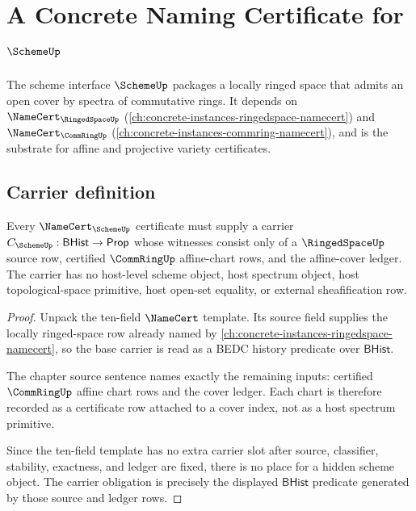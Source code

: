 \chapter{A Concrete Naming Certificate for $\SchemeUp$}
\label{ch:concrete-instances-scheme-namecert}

The scheme interface $\SchemeUp$ packages a locally ringed space that admits an open cover by spectra of commutative rings. It depends on $\NameCert_{\RingedSpaceUp}$ (\autoref{ch:concrete-instances-ringedspace-namecert}) and $\NameCert_{\CommRingUp}$ (\autoref{ch:concrete-instances-commring-namecert}), and is the substrate for affine and projective variety certificates.

\section{Carrier definition}
\label{sec:scheme-carrier}

\begin{theorem}\label{thm:scheme-carrier-obligation}
Every $\NameCert_{\SchemeUp}$ certificate must supply a carrier $C_{\SchemeUp}:\mathsf{BHist}\to\mathsf{Prop}$ whose witnesses consist only of a $\RingedSpaceUp$ source row, certified $\CommRingUp$ affine-chart rows, and the affine-cover ledger. The carrier has no host-level scheme object, host spectrum object, host topological-space primitive, host open-set equality, or external sheafification row.
\end{theorem}
\begin{proof}
Unpack the ten-field $\NameCert$ template. Its source field supplies the locally ringed-space row already named by \autoref{ch:concrete-instances-ringedspace-namecert}, so the base carrier is read as a BEDC history predicate over $\mathsf{BHist}$.

The chapter source sentence names exactly the remaining inputs: certified $\CommRingUp$ affine chart rows and the cover ledger. Each chart is therefore recorded as a certificate row attached to a cover index, not as a host spectrum primitive.

Since the ten-field template has no extra carrier slot after source, classifier, stability, exactness, and ledger are fixed, there is no place for a hidden scheme object. The carrier obligation is precisely the displayed $\mathsf{BHist}$ predicate generated by those source and ledger rows.
\end{proof}

